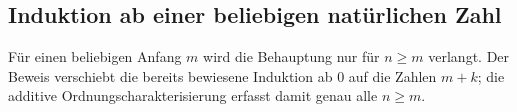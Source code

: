 \documentclass[main.tex]{subfiles}
\begin{document}
\begin{tabproof}
\end{tabproof}

\subsection{Induktion ab einer beliebigen natürlichen Zahl}

Für einen beliebigen Anfang \(m\) wird die Behauptung nur für
\(n\geq m\) verlangt. Der Beweis verschiebt die bereits bewiesene
Induktion ab \(0\) auf die Zahlen \(m+k\); die additive
Ordnungscharakterisierung erfasst damit genau alle \(n\geq m\).
\end{document}
